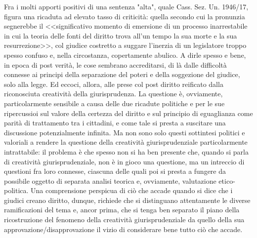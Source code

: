 Fra i molti apporti positivi di una sentenza "alta", quale Cass. Sez. Un. 1946/17, figura una ricaduta ad elevato tasso di criticità: quella secondo cui la pronunzia segnerebbe il <<significativo momento di emersione di un processo inarrestabile in cui la teoria delle fonti del diritto trova all'un tempo la sua morte e la sua resurrezione>>, col giudice costretto a suggare l'inerzia di un legislatore troppo spesso confuso e, nella circostanza, copertamente abulico.
A dirle spesso e bene, in epoca di post verità, le cose sembrano accreditarsi, di là dalle difficoltà connesse ai principi della separazione del poteri e della soggezione del giudice, solo alla legge. Ed eccoci, allora, alle prese col post diritto reificato dalla riconosciuta creatività della giurisprudenza.
La questione è, ovviamente, particolarmente sensibile a causa delle due ricadute politiche e per le sue ripercussioi sul valore della certezza del diritto e sul principio di eguaglianza come parità di trattamento tra i cittadini, e come tale si presta a suscitare una discussione potenzialmente infinita.
Ma non sono solo questi sottintesi politici e valoriali a rendere la questione della creatività giurisprudenziale particolarmente intrattabile: il problema è che spesso non si ha ben presente che, quando si parla di creatività giurisprudenziale, non è in gioco una questione, ma un intreccio di questioni fra loro connesse, ciascuna delle quali poi si presta a fungere da possibile oggetto di separata analisi teorica e, ovviamente, valutazione etico-politica.
Una comprensione perspicua di ciò che accade quando si dice che i giudici creano diritto, dunque, richiede che si distinguano attentamente le diverse ramificazioni del tema e, ancor prima, che si tenga ben separato il piano della ricostruzione del fenomeno della creatività giurisprudenziale da quello della sua approvazione/disapprovazione il vizio di considerare bene tutto ciò che accade. 

